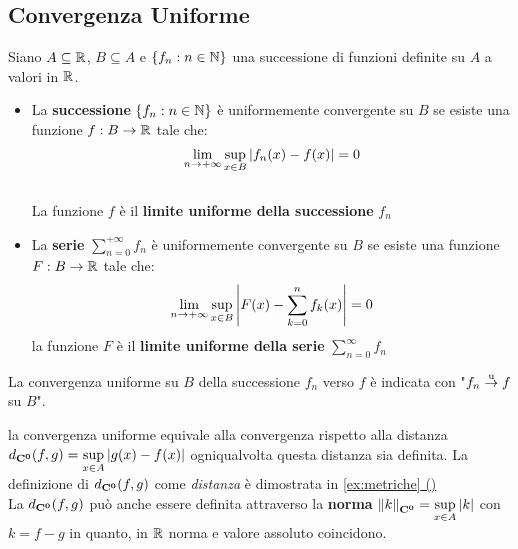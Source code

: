 \subsection{Convergenza Uniforme}\label{sect:conv_unif}
\begin{definition}
	\label{def:conv_unif}
	Siano $A\subseteq \mathbb{R}$, $B\subseteq A$ e $\left\{f_n:n\in\mathbb{N}\right\}$ una successione di funzioni definite su $A$ a valori in $\mathbb{R}$.
	\begin{itemize}
		\item La \textbf{successione} $\left\{f_n:n\in \mathbb{N}\right\}$ è uniformemente convergente su $B$ se esiste una funzione $f:B\to \mathbb{R}$ tale che:
		\[\lim\limits_{n \to +\infty} \sup\limits_{x\in B}\left|f_n(x)-f(x)\right|=0\]\\
		La funzione $f$ è il \textbf{limite uniforme della successione} $f_n$
		\item La \textbf{serie} $\sum\limits_{n=0}^{+\infty}f_n$ è uniformemente convergente su $B$ se esiste una funzione $F:B\to \mathbb{R}$ tale che:
		\[\lim\limits_{n\to +\infty} \sup\limits_{x\in B}\left|F(x)-\sum\limits_{k=0}^n f_k(x)\right|=0\]
		la funzione $F$ è il \textbf{limite uniforme della serie} $\sum\limits_{n=0}^{\infty}f_n$
	\end{itemize}
	La convergenza uniforme su $B$ della successione $f_n$ verso $f$ è indicata con "$f_n \overset{\text{u}}{\to} f$ su $B$".
\end{definition}
\begin{observation}
	\label{obs:dist_conv_unif}
	la convergenza uniforme equivale alla convergenza rispetto alla distanza $d_{\mathbf{C^{0}}}(f,g)=\sup\limits_{x\in A}\left|g(x)-f(x)\right|$ ogniqualvolta questa distanza sia definita. La definizione di $d_{\mathbf{C^{0}}}(f,g)$ come \textit{distanza} è dimostrata in \hyperref[ex:dim_dist_conv_unif]{\cref*{ex:metriche} ()}\\
	La $d_{\mathbf{C^{0}}}(f,g)$ può anche essere definita attraverso la \textbf{norma} $\left\|k\right\|_{\mathbf{C^{0}}}=\sup\limits_{x\in A}\left|k\right|$ con $k = f-g$ in quanto, in $\mathbb{R}$ norma e valore assoluto coincidono.
\end{observation}
\begin{proposition}
	\label{prop:dist_lin_non_cont}
\end{proposition}
\begin{example}
	\label{ex:BBBBBBBBBB}
\end{example}
\begin{definition}
	\label{def:AAAAAAAAA}
\end{definition}


